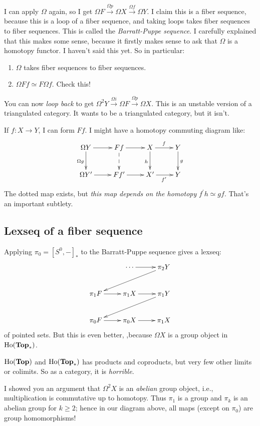 I can apply $\Omega$ again, so I get $\Omega F\xrightarrow{\Omega p} \Omega X\xrightarrow{\Omega f} \Omega Y$. I claim this is a fiber sequence, because this is a loop of a fiber sequence, and taking loops takes fiber sequences to fiber sequences. This is called the \emph{Barratt-Puppe sequence}. I carefully explained that this makes some sense, because it firstly makes sense to ask that $\Omega$ is a homotopy functor. I haven't said this yet. So in particular:
\begin{enumerate}
    \item $\Omega$ takes fiber sequences to fiber sequences.
    \item $\Omega Ff\simeq F\Omega f$. Check this!
\end{enumerate}
You can now \emph{loop back} to get $\Omega^2 Y\xrightarrow{\Omega i} \Omega F\xrightarrow{\Omega p}\Omega X$. This is an unstable version of a triangulated category. It wants to be a triangulated category, but it isn't.
\begin{remark}
    If $f:X\to Y$, I can form $Ff$. I might have a homotopy commuting diagram like:
    \begin{equation*}
	\xymatrix{
	    \Omega Y\ar[d]_{\Omega g}\ar[r] & Ff\ar@{-->}[d]\ar[r] & X\ar[d]_{h}\ar[r]^f & Y\ar[d]^g\\
	    \Omega Y^\prime\ar[r] & Ff^\prime\ar[r] & X^\prime\ar[r]_{f^\prime} & Y
	    }
    \end{equation*}
    The dotted map exists, but \emph{this map depends on the homotopy} $f^\prime h\simeq gf$. That's an important subtlety.
\end{remark}
\subsection{Lexseq of a fiber sequence}
Applying $\pi_0 = [S^0,-]_\ast$ to the Barratt-Puppe sequence gives a lexseq:
\begin{equation*}
    \xymatrix{
	& \cdots\ar[r] & \pi_2 Y\ar[dll]\\
	\pi_1 F\ar[r] & \pi_1 X\ar[r] & \pi_1 Y\ar[dll]\\
	\pi_0 F\ar[r] & \pi_0 X\ar[r] & \pi_1 X
    }
\end{equation*}
of pointed sets. But this is even better, ,because $\Omega X$ is a group object in $\mathrm{Ho}(\mathbf{Top}_\ast)$.
\begin{remark}
    $\mathrm{Ho}(\mathbf{Top})$ and $\mathrm{Ho}(\mathbf{Top}_\ast)$ has products and coproducts, but very few other limits or colimits. So as a category, it is \emph{horrible}.
\end{remark}
I showed you an argument that $\Omega^2 X$ is an \emph{abelian} group object, i.e., multiplication is commutative up to homotopy. Thus $\pi_1$ is a group and $\pi_k$ is an abelian group for $k\geq 2$; hence in our diagram above, all maps (except on $\pi_0$) are group homomorphisms!

